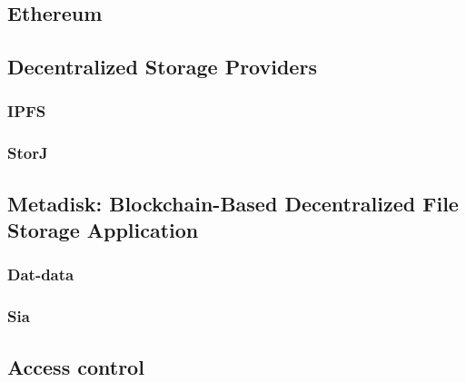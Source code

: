 \subsection{Ethereum}

\subsection{Decentralized Storage Providers}

\subsubsection{IPFS}

\subsubsection{StorJ}
\subsection{Metadisk: Blockchain-Based Decentralized File Storage Application}

\subsubsection{Dat-data}

\subsubsection{Sia}

\subsection{Access control}

